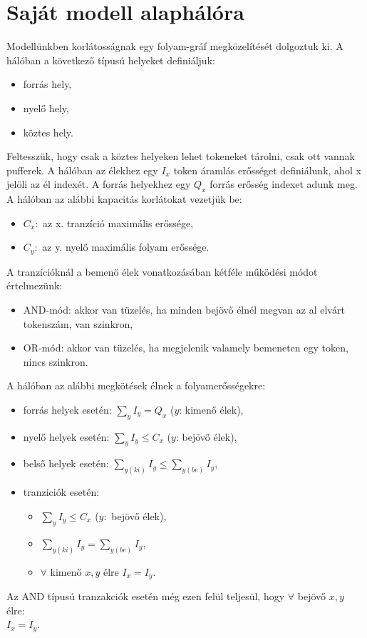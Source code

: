 \section{Saját modell alaphálóra}

Modellünkben korlátosságnak egy folyam-gráf megközelítését dolgoztuk ki.  A hálóban a következő típusú helyeket definiáljuk:
\begin{itemize}
\item forrás hely,
\item nyelő hely,
\item köztes hely.
\end{itemize}
Feltesszük, hogy csak a köztes helyeken lehet tokeneket tárolni, csak ott vannak pufferek. A hálóban az élekhez egy $I_x$ token áramlás erősséget definiálunk, ahol x jelöli az él indexét. A forrás helyekhez egy $Q_x$ forrás erősség indexet adunk meg. A hálóban az alábbi kapacitás korlátokat vezetjük be:
\begin{itemize}
\item $C_x:$ az x. tranzíció maximális erőssége,
\item $C_y:$ az y. nyelő maximális folyam erőssége.
\end{itemize}

A tranzícióknál a bemenő élek vonatkozásában kétféle működési módot értelmezünk:
\begin{itemize}
\item AND-mód: akkor van tüzelés, ha minden bejövő élnél megvan az al elvárt tokenszám, van szinkron,
\item OR-mód: akkor van tüzelés, ha megjelenik valamely bemeneten egy token, nincs szinkron.
\end{itemize}
A hálóban az alábbi megkötések élnek a folyamerősségekre:
\begin{itemize}
\item forrás helyek esetén: $\sum_y I_y=Q_x$ ($y$: kimenő élek),
\item nyelő helyek esetén: $\sum_y I_y \leq C_x$ ($y$: bejövő élek),
\item belső helyek esetén: 
$\sum_{y(ki)} I_y\leq \sum_{y(be)} I_y$,
\item tranziciók esetén: 
\begin{itemize}
\item $\sum_y I_y\leq C_x$ ($y:$ bejövő élek),
\item $\sum_{y(ki)} I_y = \sum_{y(be)} I_y$,
\item $\forall$ kimenő $x,y$ élre $I_x=I_y$.
\end{itemize}
\end{itemize}
Az AND típusú tranzakciók esetén még ezen felül teljesül, hogy $\forall$ bejövő $x,y$ élre:\\
$I_x = I_y$.

